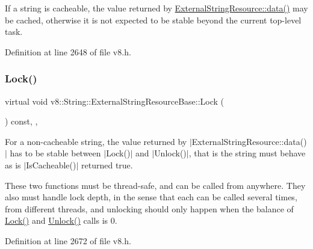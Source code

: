 If a string is cacheable, the value returned by \mbox{\hyperlink{classv8_1_1String_1_1ExternalStringResource_a987309199b848511adb708e221e0fb0a}{External\+String\+Resource\+::data()}} may be cached, otherwise it is not expected to be stable beyond the current top-\/level task. 

Definition at line 2648 of file v8.\+h.

\mbox{\label{classv8_1_1String_1_1ExternalStringResourceBase_ae539b974907cc2737e58797ace2652b4}} 
\subsubsection{\texorpdfstring{Lock()}{Lock()}}
{\footnotesize\ttfamily virtual void v8\+::\+String\+::\+External\+String\+Resource\+Base\+::\+Lock (\begin{DoxyParamCaption}{ }\end{DoxyParamCaption}) const\hspace{0.3cm}{\ttfamily [inline]}, {\ttfamily [protected]}, {\ttfamily [virtual]}}

For a non-\/cacheable string, the value returned by $\vert$\+External\+String\+Resource\+::data()$\vert$ has to be stable between $\vert$\+Lock()$\vert$ and $\vert$\+Unlock()$\vert$, that is the string must behave as is $\vert$\+Is\+Cacheable()$\vert$ returned true.

These two functions must be thread-\/safe, and can be called from anywhere. They also must handle lock depth, in the sense that each can be called several times, from different threads, and unlocking should only happen when the balance of \mbox{\hyperlink{classv8_1_1String_1_1ExternalStringResourceBase_ae539b974907cc2737e58797ace2652b4}{Lock()}} and \mbox{\hyperlink{classv8_1_1String_1_1ExternalStringResourceBase_a6c6892d46c8fafaa938df542a6e334cd}{Unlock()}} calls is 0. 

Definition at line 2672 of file v8.\+h.

\mbox{\label{classv8_1_1String_1_1ExternalStringResourceBase_a6c6892d46c8fafaa938df542a6e334cd}} 
